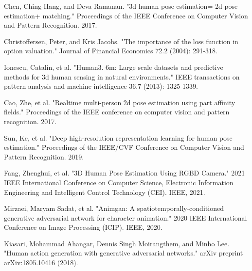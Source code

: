 \begin{thebibliography}{9}
Chen, Ching-Hang, and Deva Ramanan. "3d human pose estimation= 2d pose estimation+ matching." Proceedings of the IEEE Conference on Computer Vision and Pattern Recognition. 2017.

Christoffersen, Peter, and Kris Jacobs. "The importance of the loss function in option valuation." Journal of Financial Economics 72.2 (2004): 291-318.

Ionescu, Catalin, et al. "Human3. 6m: Large scale datasets and predictive methods for 3d human sensing in natural environments." IEEE transactions on pattern analysis and machine intelligence 36.7 (2013): 1325-1339.

Cao, Zhe, et al. "Realtime multi-person 2d pose estimation using part affinity fields." Proceedings of the IEEE conference on computer vision and pattern recognition. 2017.

Sun, Ke, et al. "Deep high-resolution representation learning for human pose estimation." Proceedings of the IEEE/CVF Conference on Computer Vision and Pattern Recognition. 2019.

Fang, Zhenghui, et al. "3D Human Pose Estimation Using RGBD Camera." 2021 IEEE International Conference on Computer Science, Electronic Information Engineering and Intelligent Control Technology (CEI). IEEE, 2021.

Mirzaei, Maryam Sadat, et al. "Animgan: A spatiotemporally-conditioned generative adversarial network for character animation." 2020 IEEE International Conference on Image Processing (ICIP). IEEE, 2020.

Kiasari, Mohammad Ahangar, Dennis Singh Moirangthem, and Minho Lee. "Human action generation with generative adversarial networks." arXiv preprint arXiv:1805.10416 (2018).

\end{thebibliography}

